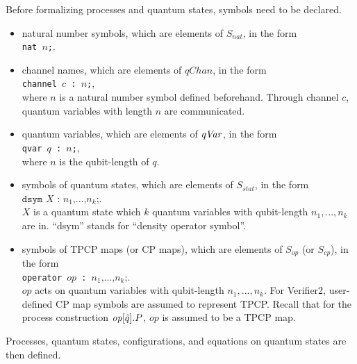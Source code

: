 Before formalizing processes and
quantum states, symbols need to be declared.
\begin{itemize}
\item natural number symbols, which are 
      elements of $S_{\mathit{nat}}$, in the form \\
      {\tt nat $\mathit{n}$;}.
\item channel names, which are elements of $\mathit{qChan}$,
      in the form \\{\tt channel $\mathit{c}$ :
      $\mathit{n}$;},\\
      where $\mathit{n}$
      is a natural number symbol defined beforehand. Through channel $c$,
      quantum variables with length $\mathit{n}$ are communicated.
\item quantum variables, which are elements of $\mathit{qVar}$, 
      in the form \\
      {\tt qvar $\mathit{q}$ : $\mathit{n}$;},\\
      where $n$ is the qubit-length of $q$.
\item symbols of quantum states, which are 
      elements of $S_{\mathit{stat}}$, in the form\\
      $\texttt{dsym}$ $\mathit{X}$ $\texttt{:}$ $n_1 \texttt{,}
      ...\texttt{,}
      n_k\texttt{;}$.\\
      $X$ is a quantum state which $k$ quantum variables with
      qubit-length
      $n_1,...,n_k$ are in. ``dsym'' stands for 
      ``density operator symbol''.
\item symbols of TPCP maps (or CP maps), which are elements of
      $S_{\mathit{op}}$ (or $S_{\mathit{cp}}$), in the form\\
      {\tt operator $\mathit{op}$ : $n_1 \texttt{,} ...\texttt{,}
      n_k\texttt{;}$}.\\
      $\mathit{op}$ acts on 
      quantum variables with qubit-length $n_1,...,n_k$.
      For Verifier2, user-defined CP map symbols are assumed to 
      represent TPCP. Recall that for the process construction 
      $\mathit{op}[\tilde q].P$, $\mathit{op}$ is assumed to
      be a TPCP map.
\end{itemize}
Processes, quantum states, configurations, and 
equations on quantum states are then defined.
